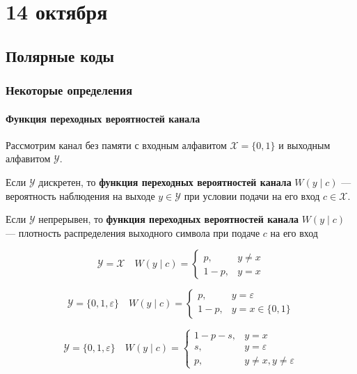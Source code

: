 \chapter{14 октября}

\section{Полярные коды}

\subsection{Некоторые определения}

\subsubsection{Функция переходных вероятностей канала}

\begin{definition}
Рассмотрим канал без памяти с входным алфавитом \(\mathcal{X} = \{0, 1\}\) и
выходным алфавитом \(\mathcal{Y}\).

Если \(\mathcal{Y}\) дискретен, то \textbf{функция переходных вероятностей канала} \(W(y \mid c)\)
--- вероятность наблюдения на выходе \(y \in \mathcal{Y}\)
при условии подачи на его вход \(c \in \mathcal{X}\).

Если \(\mathcal{Y}\) непрерывен, то \textbf{функция переходных вероятностей канала} \(W(y \mid c)\)
--- плотность распределения выходного символа при подаче \(c\) на его вход
\end{definition}

\begin{example}
    \[\mathcal{Y} = \mathcal{X} \quad W(y \mid c) = \begin{cases}
        p, & y \neq x \\
        1 - p, & y = x
    \end{cases}\]
\end{example}

\begin{example}
    \[\mathcal{Y} = \{0, 1, \varepsilon\} \quad W(y \mid c) = \begin{cases}
        p, & y = \varepsilon \\
        1 - p, & y = x \in \{0, 1\}
    \end{cases}\]
\end{example}

\begin{example}
    \[\mathcal{Y} = \{0, 1, \varepsilon\} \quad W(y \mid c) = \begin{cases}
        1 - p - s, & y = x \\
        s, & y = \varepsilon \\
        p, & y \neq x, y \neq \varepsilon
    \end{cases}\]
\end{example}

